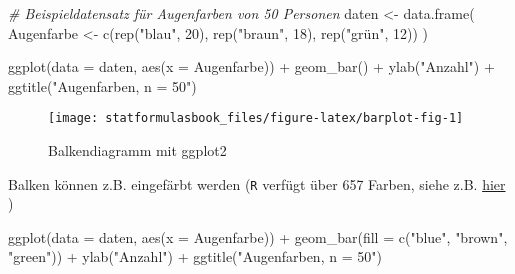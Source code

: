 \documentclass[
]{book}
\newenvironment{Shaded}{\begin{snugshade}}{\end{snugshade}}
\newcommand{\AttributeTok}[1]{\textcolor[rgb]{0.77,0.63,0.00}{#1}}
\newcommand{\CommentTok}[1]{\textcolor[rgb]{0.56,0.35,0.01}{\textit{#1}}}
\newcommand{\DecValTok}[1]{\textcolor[rgb]{0.00,0.00,0.81}{#1}}
\newcommand{\FunctionTok}[1]{\textcolor[rgb]{0.00,0.00,0.00}{#1}}
\newcommand{\NormalTok}[1]{#1}
\newcommand{\OtherTok}[1]{\textcolor[rgb]{0.56,0.35,0.01}{#1}}
\newcommand{\SpecialCharTok}[1]{\textcolor[rgb]{0.00,0.00,0.00}{#1}}
\newcommand{\StringTok}[1]{\textcolor[rgb]{0.31,0.60,0.02}{#1}}
\begin{document}
\begin{Shaded}
\begin{Highlighting}[]
\CommentTok{\# Beispieldatensatz für Augenfarben von 50 Personen  }
\NormalTok{daten }\OtherTok{\textless{}{-}} \FunctionTok{data.frame}\NormalTok{(}
\NormalTok{  Augenfarbe }\OtherTok{\textless{}{-}} \FunctionTok{c}\NormalTok{(}\FunctionTok{rep}\NormalTok{(}\StringTok{"blau"}\NormalTok{, }\DecValTok{20}\NormalTok{), }\FunctionTok{rep}\NormalTok{(}\StringTok{"braun"}\NormalTok{, }\DecValTok{18}\NormalTok{), }\FunctionTok{rep}\NormalTok{(}\StringTok{"grün"}\NormalTok{, }\DecValTok{12}\NormalTok{))}
\NormalTok{)}

\FunctionTok{ggplot}\NormalTok{(}\AttributeTok{data =}\NormalTok{ daten, }\FunctionTok{aes}\NormalTok{(}\AttributeTok{x =}\NormalTok{ Augenfarbe)) }\SpecialCharTok{+}
  \FunctionTok{geom\_bar}\NormalTok{() }\SpecialCharTok{+}
  \FunctionTok{ylab}\NormalTok{(}\StringTok{"Anzahl"}\NormalTok{) }\SpecialCharTok{+}
  \FunctionTok{ggtitle}\NormalTok{(}\StringTok{"Augenfarben, n = 50"}\NormalTok{)}
\end{Highlighting}
\end{Shaded}

\begin{figure}

{\centering \texttt{[image: statformulasbook\_files/figure-latex/barplot-fig-1]} 

}

\caption{Balkendiagramm mit ggplot2}\label{fig:barplot-fig}
\end{figure}

Balken können z.B. eingefärbt werden (\texttt{R} verfügt über 657 Farben, siehe z.B. \href{http://sape.inf.usi.ch/quick-reference/ggplot2/colour}{hier} )

\begin{Shaded}
\begin{Highlighting}[]
\FunctionTok{ggplot}\NormalTok{(}\AttributeTok{data =}\NormalTok{ daten, }\FunctionTok{aes}\NormalTok{(}\AttributeTok{x =}\NormalTok{ Augenfarbe)) }\SpecialCharTok{+}
  \FunctionTok{geom\_bar}\NormalTok{(}\AttributeTok{fill =} \FunctionTok{c}\NormalTok{(}\StringTok{"blue"}\NormalTok{, }\StringTok{"brown"}\NormalTok{, }\StringTok{"green"}\NormalTok{)) }\SpecialCharTok{+}
  \FunctionTok{ylab}\NormalTok{(}\StringTok{"Anzahl"}\NormalTok{) }\SpecialCharTok{+}
  \FunctionTok{ggtitle}\NormalTok{(}\StringTok{"Augenfarben, n = 50"}\NormalTok{)}
\end{Highlighting}
\end{Shaded}
\end{document}
